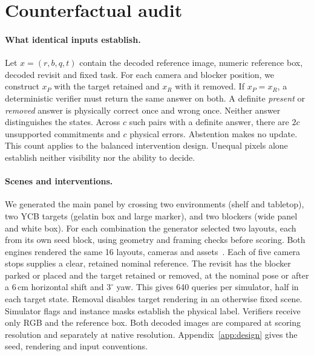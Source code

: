 \documentclass{article}
\begin{document}
\section{Counterfactual audit}
\label{sec:design}

\paragraph{What identical inputs establish.}
Let $x=(r,b,q,t)$ contain the decoded reference image, numeric reference box, decoded revisit and fixed task. For each camera and blocker position, we construct $x_P$ with the target retained and $x_R$ with it removed.
If $x_P=x_R$, a deterministic verifier must return the same answer on both. A definite \emph{present} or \emph{removed} answer is physically correct once and wrong once. Neither answer distinguishes the states. Across $c$ such pairs with a definite answer, there are $2c$ unsupported commitments and $c$ physical errors. Abstention makes no update.
This count applies to the balanced intervention design. Unequal pixels alone establish neither visibility nor the ability to decide.

\paragraph{Scenes and interventions.}
We generated the main panel by crossing two environments (shelf and tabletop), two YCB targets (gelatin box and large marker), and two blockers (wide panel and white box). For each combination the generator selected two layouts, each from its own seed block, using geometry and framing checks before scoring. Both engines rendered the same 16 layouts, cameras and assets~\citep{ycb,posecnn,isaac,mujoco}.
Each of five camera stops supplies a clear, retained nominal reference. The revisit has the blocker parked or placed and the target retained or removed, at the nominal pose or after a 6\,cm horizontal shift and $3^\circ$ yaw. This gives 640 queries per simulator, half in each target state.
Removal disables target rendering in an otherwise fixed scene. Simulator flags and instance masks establish the physical label. Verifiers receive only RGB and the reference box.
Both decoded images are compared at scoring resolution and separately at native resolution. Appendix~\ref{app:design} gives the seed, rendering and input conventions.
\end{document}
